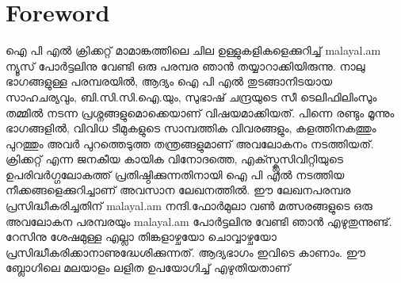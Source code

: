 \section*{Foreword}
\vskip 2pt


ഐ പി എല്‍ ക്രിക്കറ്റ് മാമാങ്കത്തിലെ ചില ഉള്ളുകളികളെക്കുറിച്ച് malayal.am ന്യൂസ് പോര്‍ട്ടലിനു വേണ്ടി ഒരു പരമ്പര ഞാന്‍ തയ്യാറാക്കിയിരുന്നു.
നാലു ഭാഗങ്ങളുള്ള പരമ്പരയില്‍, ആദ്യം ഐ പി എല്‍ തുടങ്ങാനിടയായ സാഹചര്യവും, ബി.സി.സി.ഐ.യും, സുഭാഷ് ചന്ദ്രയുടെ സീ ടെലിഫിലിംസും തമ്മില്‍ നടന്ന പ്രശ്നങ്ങളുമൊക്കെയാണ് വിഷയമാക്കിയത്.
പിന്നെ രണ്ടും മൂന്നും ഭാഗങ്ങളില്‍, വിവിധ ടീമുകളുടെ സാമ്പത്തിക വിവരങ്ങളും, കളത്തിനകത്തും പുറത്തും അവര്‍ പുറത്തെടുത്ത തന്ത്രങ്ങളുമാണ് അവലോകനം നടത്തിയത്. ക്രിക്കറ്റ് എന്ന ജനകീയ കായിക വിനോദത്തെ,
എക്സ്ക്ലൂസിവിറ്റിയുടെ ഉപരിവര്‍ഗ്ഗലോകത്ത് പ്രതിഷ്ഠിക്കുന്നതിനായി ഐ പി എല്‍ നടത്തിയ നീക്കങ്ങളെക്കുറിച്ചാണ് അവസാന ലേഖനത്തില്‍.
ഈ ലേഖനപരമ്പര പ്രസിദ്ധീകരിച്ചതിന് malayal.am നന്ദി.ഫോര്‍മുലാ വണ്‍ മത്സരങ്ങളുടെ ഒരു അവലോകന പരമ്പരയും malayal.am പോര്‍ട്ടലിനു വേണ്ടി ഞാന്‍ എഴുതുന്നുണ്ട്. 
റേസിനു ശേഷമുള്ള എല്ലാ തിങ്കളാഴ്ചയോ ചൊവ്വാഴ്ചയോ പ്രസിദ്ധീകരിക്കാനാണുദ്ധേശിക്കുന്നത്. ആദ്യഭാഗം ഇവിടെ കാണാം.
ഈ ബ്ലോഗിലെ മലയാളം ലളിത ഉപയോഗിച്ച് എഴുതിയതാണ്


\newpage
